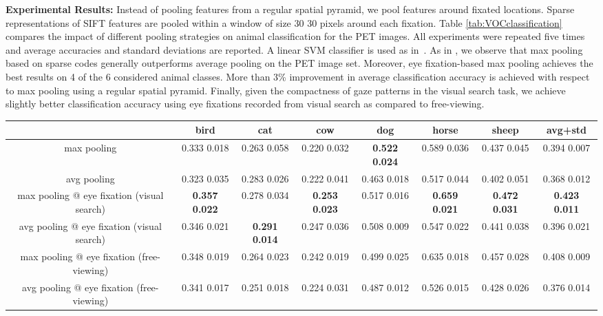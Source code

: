 \documentclass{article}
\begin{document}
\textbf{Experimental Results:} Instead of pooling features from a regular spatial pyramid, we pool features around fixated locations. Sparse representations of SIFT features are pooled within a window of size 30  30 pixels around each fixation. Table \ref{tab:VOCclassification} compares the impact of different pooling strategies on animal classification for the PET images. All experiments were repeated five times and average accuracies and standard deviations are reported. A linear SVM classifier is used as in~\cite{Yang09CVPR}. As in \cite{Yang09CVPR}, we observe that max pooling based on sparse codes generally outperforms average pooling on the PET image set. Moreover, eye fixation-based max pooling achieves the best results on 4 of the 6 considered animal classes. More than 3\%  improvement in average classification accuracy is achieved with respect to max pooling using a regular spatial pyramid. Finally, given the compactness of gaze patterns in the visual search task, we achieve slightly better classification accuracy using eye fixations recorded from visual search as compared to free-viewing.
\begin{table*}[t]
\caption{Object classification accuracy with different pooling strategies on PET images.}
\label{tab:VOCclassification}
\centering
\vspace{-0.1in}
\resizebox{0.99\linewidth}{!} {
\begin{tabular}{|c||c|c|c|c|c|c||c|}
\hline
& bird & cat & cow & dog & horse & sheep & avg+std\\ \hline \hline
max pooling \cite{Yang09CVPR} & 0.333  0.018 & 0.263  0.058 & 0.220  0.032 & \textbf{0.522  0.024} & 0.589  0.036 & 0.437  0.045 & 0.394  0.007 \\ \hline
avg pooling & 0.323  0.035 & 0.283  0.026 & 0.222  0.041 & 0.463  0.018 & 0.517  0.044 & 0.402  0.051 & 0.368  0.012\\ \hline
max pooling @ eye fixation (visual search) & \textbf{0.357  0.022} & 0.278  0.034 & \textbf{0.253  0.023} & 0.517  0.016 & \textbf{0.659  0.021} & \textbf{0.472  0.031} & \textbf{0.423  0.011} \\ \hline
avg pooling @ eye fixation (visual search) & 0.346  0.021 & \textbf{0.291  0.014} & 0.247  0.036 & 0.508  0.009 & 0.547  0.022 & 0.441  0.038 & 0.396  0.021\\ \hline
max pooling @ eye fixation (free-viewing) & 0.348  0.019 & 0.264  0.023 & 0.242  0.019 & 0.499  0.025 & 0.635  0.018 & 0.457  0.028 & 0.408  0.009 \\ \hline
avg pooling @ eye fixation (free-viewing) & 0.341  0.017 & 0.251  0.018 & 0.224  0.031 & 0.487  0.012 & 0.526  0.015 & 0.428  0.026 & 0.376  0.014\\ \hline
\end{tabular}
}
\end{table*}
\end{document}
